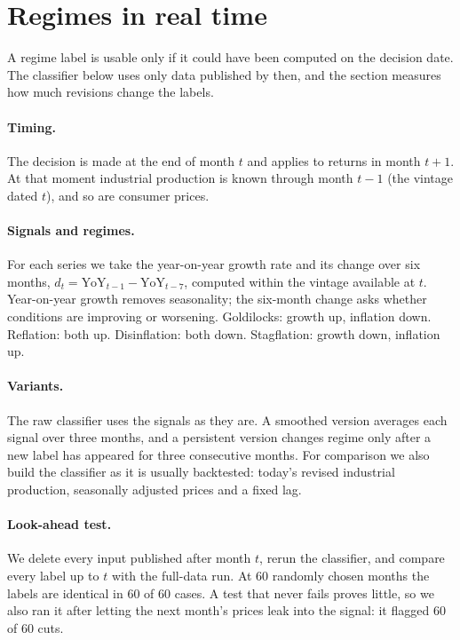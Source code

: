 \documentclass[11pt,a4paper]{article}
\begin{document}
\section{Regimes in real time}
\label{sec:regimes}

A regime label is usable only if it could have been computed on the decision date. The classifier below uses only data published by then, and the section measures how much revisions change the labels.


\paragraph{Timing.} The decision is made at the end of month $t$ and applies to returns in month $t+1$. At that
moment industrial production is known through month $t-1$ (the vintage dated $t$), and so are consumer
prices.

\paragraph{Signals and regimes.} For each series we take the year-on-year growth rate and its change over six
months, $d_t = \text{YoY}_{t-1} - \text{YoY}_{t-7}$, computed within the vintage available at $t$. Year-on-year
growth removes seasonality; the six-month change asks whether conditions are improving or worsening.
Goldilocks: growth up, inflation down. Reflation: both up. Disinflation: both down. Stagflation: growth down,
inflation up.

\paragraph{Variants.} The raw classifier uses the signals as they are. A smoothed version averages each signal
over three months, and a persistent version changes regime only after a new label has appeared for three
consecutive months. For comparison we also build the classifier as it is usually backtested: today's revised
industrial production, seasonally adjusted prices and a fixed lag.

\paragraph{Look-ahead test.} We delete every input published after month $t$, rerun the classifier, and compare
every label up to $t$ with the full-data run. At 60 randomly chosen months the labels are identical in
60 of 60 cases. A test that never fails proves little, so we also ran it after letting the next
month's prices leak into the signal: it flagged 60 of 60 cuts.
\end{document}
